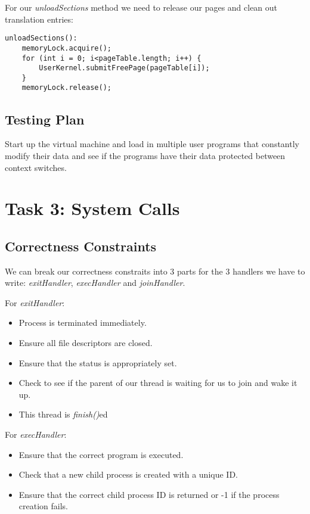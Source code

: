 \documentclass{article}
\begin{document}
For our \textit{unloadSections} method we need to release our pages and clean out translation entries:
\begin{verbatim}
unloadSections():
    memoryLock.acquire();
    for (int i = 0; i<pageTable.length; i++) {
        UserKernel.submitFreePage(pageTable[i]);
    }
    memoryLock.release();
\end{verbatim}

\subsection*{Testing Plan}

Start up the virtual machine and load in multiple user programs that constantly
modify their data and see if the programs have their data protected between
context switches.

\section*{Task 3: System Calls}

\subsection*{Correctness Constraints}
We can break our correctness constraits into 3 parts for the 3 handlers we have to write: \textit{exitHandler},
\textit{execHandler} and \textit{joinHandler}.

For \textit{exitHandler}:
\begin{itemize}
\item Process is terminated immediately.
\item Ensure all file descriptors are closed.
\item Ensure that the status is appropriately set.
\item Check to see if the parent of our thread is waiting for us to join and wake it up.
\item This thread is \textit{finish()}ed
\end{itemize}

For \textit{execHandler}:
\begin{itemize}
\item Ensure that the correct program is executed.
\item Check that a new child process is created with a unique ID.
\item Ensure that the correct child process ID is returned or -1 if the process creation fails.
\end{itemize}
\end{document}
